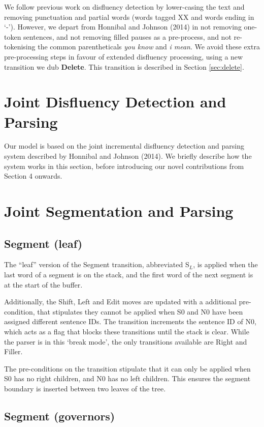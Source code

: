 \documentclass[11pt,letterpaper]{article}
\begin{document}
We follow previous work on disfluency detection by lower-casing the text and
removing punctuation and partial words (words tagged XX and words ending in
`-').  However, we depart from Honnibal and Johnson (2014) in not removing one-token
sentences, and not removing filled pauses as a pre-process, and not
re-tokenising the common parentheticals \emph{you know} and \emph{i mean}.
We avoid these extra pre-processing steps in favour of extended disfluency processing,
using a new transition we dub \textbf{Delete}.  This transition is described in
Section \ref{sec:delete}.

\section{Joint Disfluency Detection and Parsing}

Our model is based on the joint incremental disfluency detection and parsing
system described by Honnibal and Johnson (2014).  We briefly describe how the
system works in this section, before introducing our novel contributions from
Section 4 onwards.


\section{Joint Segmentation and Parsing}

\subsection{Segment (leaf)}

The ``leaf'' version of the Segment transition, abbreviated S$_L$, is applied when
the last word of a segment is on the stack, and the first word of the next segment
is at the start of the buffer.

Additionally, the Shift, Left and Edit moves are updated with a additional
pre-condition, that stipulates they cannot be applied when S0 and N0 have
been assigned different sentence IDs.  The transition increments the sentence
ID of N0, which acts as a flag that blocks these transitions until the stack is clear.
While the parser is in this `break mode', the only transitions available are
Right and Filler.

The pre-conditions on the transition stipulate that it can only be applied when
S0 has no right children, and N0 has no left children.  This ensures the segment
boundary is inserted between two leaves of the tree.

\subsection{Segment (governors)}
\end{document}
